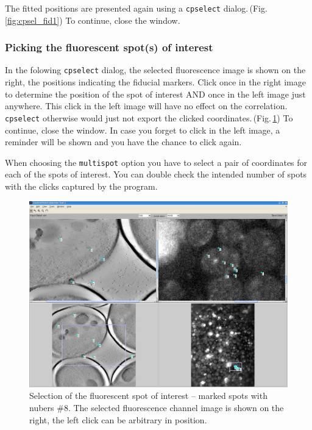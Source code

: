 \documentclass[10pt,a4paper,onepage,DIV12]{scrartcl}
\begin{document}
The fitted positions are presented again using a \texttt{cpselect} dialog.\,(Fig.\,\ref{fig:cpsel_fid1}) To continue, close the window.




 

% 

\subsubsection{Picking the fluorescent spot(s) of interest}
In the folowing \texttt{cpselect} dialog, the selected fluorescence image is shown on the right, the positions indicating the fiducial markers. Click once in the right image to determine the position of the spot of interest AND once in the left image just anywhere. This click in the left image will have no effect on the correlation. \texttt{cpselect} otherwise would just not export the clicked coordinates.\,(Fig.\,\ref{fig:cpsel_fluor1}) To continue, close the window. In case you forget to click in the left image, a reminder will be shown and you have the chance to click again. 

When choosing the \texttt{multispot} option you have to select a pair of coordinates for each of the spots of interest. You can double check the intended number of spots with the clicks captured by the program.
\begin{figure}
 \centering
 \includegraphics[width=.78\textwidth]{images/cpsel_fluor1.jpg}
 \caption{Selection of the fluorescent spot of interest -- marked spots with nubers \#8. The selected fluorescence channel image is shown on the right, the left click can be arbitrary in position.}
 \label{fig:cpsel_fluor1}
\end{figure}
\end{document}
